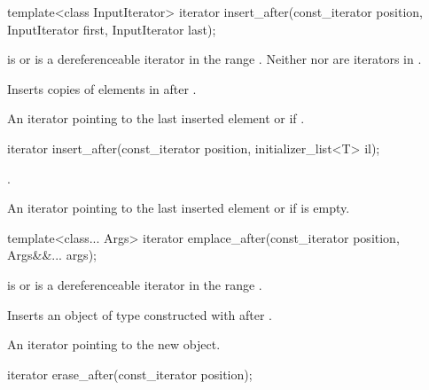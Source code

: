 %
\begin{itemdecl}
template<class InputIterator>
  iterator insert_after(const_iterator position, InputIterator first, InputIterator last);
\end{itemdecl}

\begin{itemdescr}
\pnum
\expects
{} is  or is a dereferenceable
iterator in the range .
Neither  nor  are iterators in .

\pnum
\effects
Inserts copies of elements in  after .

\pnum
\returns
An iterator pointing to the last inserted element or  if .
\end{itemdescr}

%
\begin{itemdecl}
iterator insert_after(const_iterator position, initializer_list<T> il);
\end{itemdecl}

\begin{itemdescr}
\pnum
\effects
{}.

\pnum
\returns
An iterator pointing to the last inserted element or  if  is empty.
\end{itemdescr}


%
\begin{itemdecl}
template<class... Args>
  iterator emplace_after(const_iterator position, Args&&... args);
\end{itemdecl}

\begin{itemdescr}
\pnum
\expects
{} is  or is a dereferenceable
iterator in the range .

\pnum
\effects
Inserts an object of type  constructed with
 after .

\pnum
\returns
An iterator pointing to the new object.
\end{itemdescr}

%
\begin{itemdecl}
iterator erase_after(const_iterator position);
\end{itemdecl}

